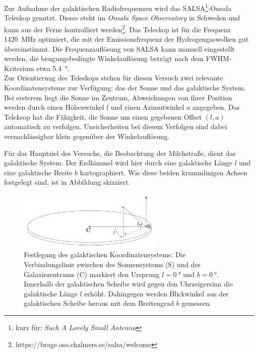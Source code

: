 \documentclass[../main.tex]{subfiles}
\begin{document}
Zur Aufnahme der galaktischen Radiofrequenzen wird das SALSA\footnote{kurz für: \textit{Such A Lovely Small Antenna}}-Onsala Teleskop genutzt. Dieses steht im \textit{Onsala Space Observatory} in Schweden und kann aus der Ferne kontrolliert werden\footnote{https://brage.oso.chalmers.se/salsa/welcome}. Das Teleskop ist für die Frequenz \SI{1420}{\mega\hertz} optimiert, die mit der Emissionsfrequenz der Hydrogengaswolken gut übereinstimmt. Die Frequenzauflösung von SALSA kann manuell eingestellt werden, die beugungsbedingte Winkelauflösung beträgt nach dem FWHM-Kriterium etwa \SI{5.4}{\degree}.\\ 

\noindent Zur Orientierung des Teleskops stehen für diesen Versuch zwei relevante Koordinatensysteme zur Verfügung: das der Sonne und das galaktische System. Bei ersterem liegt die Sonne im Zentrum, Abweichungen von ihrer Position werden durch einen Höhenwinkel $l$ und einen Azimutwinkel $a$ angegeben. Das Teleksop hat die Fähigkeit, die Sonne um einen gegebenen Offset $(l,a)$ automatisch zu verfolgen. Unsicherheiten bei diesem Verfolgen sind dabei vernachlässigbar klein gegenüber der Winkelauflösung.

 Für das Hauptziel des Versuchs, die Beobachtung der Milchstraße, dient das galaktische System. Der Erdhimmel wird hier durch eine galaktische Länge $l$ und eine galaktische Breite $b$ kartographiert. Wie diese beiden krummlinigen Achsen festgelegt sind, ist in Abbildung skizziert.
\begin{figure}[H]
    \centering
    \includegraphics[width=7cm]{Bilddateien/Aufbau/GalaktischesSystem.jpg}
    \caption{Festlegung des galaktischen Koordinatensystems: Die Verbindungslinie zwischen des Sonnensystems (S) und des Galaxiezentrums (C) markiert den Ursprung $l=\SI{0}{\degree}$ und $b=\SI{0}{\degree}$. Innerhalb der galaktischen Scheibe wird gegen den Uhrzeigersinn die galaktische Länge $l$ erhöht. Dahingegen werden Blickwinkel aus der galaktischen Scheibe heraus mit dem Breitengrad $b$ gemessen.}
\end{figure}
\end{document}
